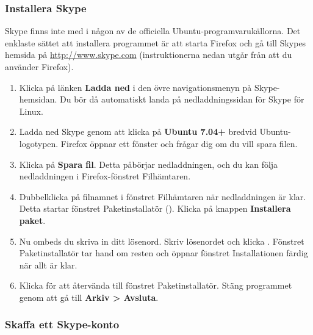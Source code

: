 \documentclass[a4paper,final]{memoir} %
\begin{document}
\subsubsection{Installera Skype}


Skype finns inte med i någon av de officiella Ubuntu-programvarukällorna. Det enklaste sättet att installera programmet är att starta Firefox och gå till Skypes hemsida på \url{http://www.skype.com} (instruktionerna nedan utgår från att du använder Firefox). 

\begin{enumerate}

\item Klicka på länken \textbf{Ladda ned} i den övre navigationsmenyn på Skype-hemsidan. Du bör då automatiskt landa på nedladdningssidan för Skype för Linux. 
\item Ladda ned Skype genom att klicka på \textbf{Ubuntu 7.04+} bredvid Ubuntu-logotypen. Firefox öppnar ett fönster och frågar dig om du vill spara filen. 
\item Klicka på \textbf{Spara fil}. Detta påbörjar nedladdningen, och du kan följa nedladdningen i Firefox-fönstret Filhämtaren.
\item Dubbelklicka på filnamnet i fönstret Filhämtaren när nedladdningen är klar. Detta startar fönstret Paketinstallatör (). Klicka på knappen \textbf{Installera paket}.
\item Nu ombeds du skriva in ditt lösenord. Skriv lösenordet och klicka \xok{}. Fönstret Paketinstallatör tar hand om resten och öppnar fönstret Installationen färdig när allt är klar. 
\item Klicka \xstang{} för att återvända till fönstret Paketinstallatör. Stäng programmet genom att gå till \textbf{Arkiv \textgreater{} Avsluta}.

\end{enumerate}



\subsubsection{Skaffa ett Skype-konto}
\end{document}
